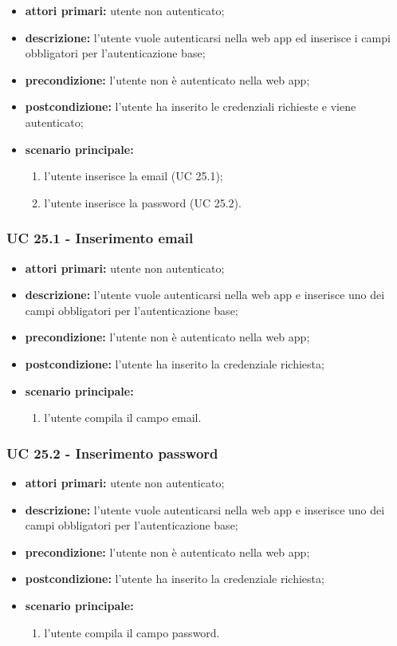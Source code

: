 		\begin{itemize}
			\item \textbf{attori primari:} utente non autenticato;
			\item \textbf{descrizione:} l'utente vuole autenticarsi nella web app ed inserisce i campi obbligatori per l'autenticazione base;
			\item \textbf{precondizione:} l'utente non è autenticato nella web app;
			\item \textbf{postcondizione:} l'utente ha inserito le credenziali richieste e viene autenticato;
			\item \textbf{scenario principale:}
			\begin{enumerate}
				\item l'utente inserisce la email (UC 25.1);
				\item l'utente inserisce la password (UC 25.2).
			\end{enumerate}
		\end{itemize}
		
		\subsubsection{UC 25.1 - Inserimento email}
		\begin{itemize}
			\item \textbf{attori primari:} utente non autenticato;
			\item \textbf{descrizione:} l'utente vuole autenticarsi nella web app e inserisce uno dei campi obbligatori per l'autenticazione base;
			\item \textbf{precondizione:} l'utente non è autenticato nella web app;
			\item \textbf{postcondizione:} l'utente ha inserito la credenziale richiesta;
			\item \textbf{scenario principale:}
			\begin{enumerate}
				\item l'utente compila il campo email.
			\end{enumerate}
		\end{itemize}
		
		\subsubsection{UC 25.2 - Inserimento password}
		\begin{itemize}
			\item \textbf{attori primari:} utente non autenticato;
			\item \textbf{descrizione:} l'utente vuole autenticarsi nella web app e inserisce uno dei campi obbligatori per l'autenticazione base;
			\item \textbf{precondizione:} l'utente non è autenticato nella web app;
			\item \textbf{postcondizione:} l'utente ha inserito la credenziale richiesta;
			\item \textbf{scenario principale:}
			\begin{enumerate}
				\item l'utente compila il campo password.
			\end{enumerate}
		\end{itemize}
		
